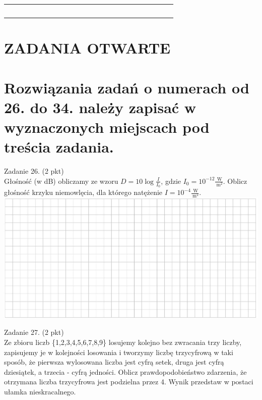 \documentclass[10pt]{article}
\begin{document}
\begin{center}
\begin{tabular}{|c|c|c|c|c|c|c|c|c|c|c|c|c|c|c|c|c|c|c|c|c|c|c|c|}
\hline
 &  &  &  &  &  &  &  &  &  &  &  &  &  &  &  &  &  &  &  &  &  &  &  \\
\hline
 &  &  &  &  &  &  &  &  &  &  &  &  &  &  &  &  &  &  &  &  &  &  &  \\
\hline
 &  &  &  &  &  &  &  &  &  &  &  &  &  &  &  &  &  &  &  &  &  &  &  \\
\hline
 &  &  &  &  &  &  &  &  &  &  &  &  &  &  &  &  &  &  &  &  &  &  &  \\
\hline
 &  &  &  &  &  &  &  &  &  &  &  &  &  &  &  &  &  &  &  &  &  &  &  \\
\hline
 &  &  &  &  &  &  &  &  &  &  &  &  &  &  &  &  &  &  &  &  &  &  &  \\
\hline
\end{tabular}
\end{center}

\section*{ZADANIA OTWARTE}
\section*{Rozwiązania zadań o numerach od 26. do 34. należy zapisać w wyznaczonych miejscach pod treścia zadania.}
Zadanie 26. (2 pkt)\\
Głośność (w dB) obliczamy ze wzoru \(D=10 \log \frac{I}{I_{0}}\), gdzie \(I_{0}=10^{-12} \frac{\mathrm{~W}}{\mathrm{~m}^{2}}\). Oblicz głośność krzyku niemowlęcia, dla którego natężenie \(I=10^{-4} \frac{\mathrm{~W}}{\mathrm{~m}^{2}}\).\\
\includegraphics[max width=\textwidth, center]{2024_11_21_8e981e1ab2c7e641f462g-10}

Zadanie 27. (2 pkt)\\
Ze zbioru liczb \{1,2,3,4,5,6,7,8,9\} losujemy kolejno bez zwracania trzy liczby, zapisujemy je w kolejności losowania i tworzymy liczbę trzycyfrową w taki sposób, że pierwsza wylosowana liczba jest cyfrą setek, druga jest cyfrą dziesiątek, a trzecia - cyfrą jedności. Oblicz prawdopodobieństwo zdarzenia, że otrzymana liczba trzycyfrowa jest podzielna przez 4. Wynik przedstaw w postaci ułamka nieskracalnego.
\end{document}

